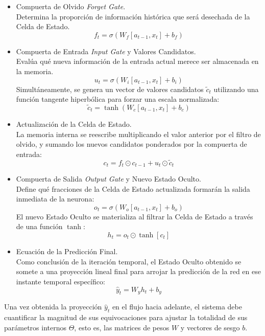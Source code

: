\documentclass[11pt,a4paper]{report}
\begin{document}
            \begin{itemize}
                \item Compuerta de Olvido \textit{Forget Gate}.\\
                Determina la proporción de información histórica que será desechada de la Celda de Estado.
                $$f_{t}=\sigma(W_{f}[a_{t-1},x_{t}]+b_{f})$$

                \item Compuerta de Entrada \textit{Input Gate} y Valores Candidatos.\\
                Evalúa qué nueva información de la entrada actual merece ser almacenada en la memoria.
                $$u_{t}=\sigma(W_{i}[a_{t-1},x_{t}]+b_{i})$$
                Simultáneamente, se genera un vector de valores candidatos $\tilde{c}_{t}$ utilizando una función tangente hiperbólica para forzar una escala normalizada:
                $$\tilde{c}_{t}=\tanh(W_{c}[a_{t-1},x_{t}]+b_{c})$$

                \item Actualización de la Celda de Estado.\\
                La memoria interna se reescribe multiplicando el valor anterior por el filtro de olvido, y sumando los nuevos candidatos ponderados por la compuerta de entrada:
                $$c_{t}=f_{t}\odot c_{t-1}+u_{t}\odot\tilde{c}_{t}$$

                \item Compuerta de Salida \textit{Output Gate} y Nuevo Estado Oculto.\\
                Define qué fracciones de la Celda de Estado actualizada formarán la salida inmediata de la neurona:
                $$o_{t}=\sigma(W_{o}[a_{t-1},x_{t}]+b_{o})$$
                El nuevo Estado Oculto se materializa al filtrar la Celda de Estado a través de una función $\tanh$:
                $$h_{t}=o_{t}\odot\tanh[c_{t}]$$

                \item Ecuación de la Predicción Final.\\
                Como conclusión de la iteración temporal, el Estado Oculto obtenido se somete a una proyección lineal final
                para arrojar la predicción de la red en ese instante temporal específico:
                $$\hat{y}_{t}=W_{y}h_{t}+b_{y}$$
            \end{itemize}

            Una vez obtenida la proyección $\hat{y}_{t}$ en el flujo hacia adelante, el sistema debe cuantificar la magnitud de sus equivocaciones
            para ajustar la totalidad de sus parámetros internos $\Theta$, esto es, las matrices de pesos $W$ y vectores de sesgo $b$.
            
\end{document}
